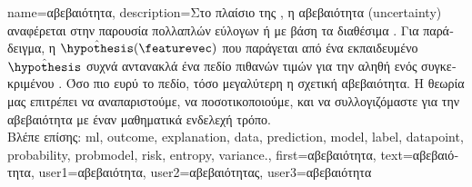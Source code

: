 {name={\foreignlanguage{greek}{αβεβαιότητα}},
	description={\foreignlanguage{greek}{Στο πλαίσιο της} , 
		\foreignlanguage{greek}{η αβεβαιότητα} (uncertainty) \foreignlanguage{greek}{αναφέρεται στην παρουσία πολλαπλών εύλογων} 
		 \foreignlanguage{greek}{ή}  \foreignlanguage{greek}{με βάση τα διαθέσιμα} 
		. \foreignlanguage{greek}{Για παράδειγμα, η}  $\hat{\hypothesis}(\featurevec)$ 
		\foreignlanguage{greek}{που παράγεται από ένα εκπαιδευμένο}   $\hat{\hypothesis}$
	 	\foreignlanguage{greek}{συχνά αντανακλά ένα πεδίο πιθανών τιμών για την αληθή}  
		\foreignlanguage{greek}{ενός συγκεκριμένου} . \foreignlanguage{greek}{Όσο πιο ευρύ το 
		πεδίο, τόσο μεγαλύτερη η σχετική αβεβαιότητα. Η θεωρία}  \foreignlanguage{greek}{μας 
		επιτρέπει να αναπαριστούμε, να ποσοτικοποιούμε, και να συλλογιζόμαστε για την αβεβαιότητα με έναν 
		μαθηματικά ενδελεχή τρόπο.} 
		\\
		\foreignlanguage{greek}{Βλέπε επίσης:} \gls{ml}, \gls{outcome}, \gls{explanation}, \gls{data}, \gls{prediction}, \gls{model}, \gls{label}, 
		\gls{datapoint}, \gls{probability}, \gls{probmodel}, \gls{risk}, \gls{entropy}, \gls{variance}.},
	first={\foreignlanguage{greek}{αβεβαιότητα}},
	text={\foreignlanguage{greek}{αβεβαιότητα}},
	user1={\foreignlanguage{greek}{αβεβαιότητα}}, %
  	user2={\foreignlanguage{greek}{αβεβαιότητας}}, %
	user3={\foreignlanguage{greek}{αβεβαιότητα}} %
}

